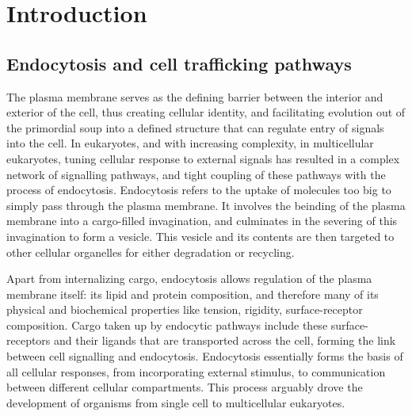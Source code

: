 \chapter{Introduction} %
\graphicspath{ {/Users/kaksonenlab/Desktop/figures/} }
\label{Ch:Intro} %

\section{Endocytosis and cell trafficking pathways}
The plasma membrane serves as the defining barrier between the interior and exterior of the cell, thus creating cellular identity, and facilitating evolution out of the primordial soup into a defined structure that can regulate entry of signals into the cell. In eukaryotes, and with increasing complexity, in multicellular eukaryotes, tuning cellular response to external signals has resulted in a complex network of signalling pathways, and tight coupling of these pathways with the process of endocytosis. Endocytosis refers to the uptake of molecules too big to simply pass through the plasma membrane. It involves the beinding of the plasma membrane into a cargo-filled invagination, and culminates in the severing of this invagination to form a vesicle. This vesicle and its contents are then targeted to other cellular organelles for either degradation or recycling. 


\vspace{5mm}

Apart from internalizing cargo, endocytosis allows regulation of the plasma membrane itself: its lipid and protein composition, and therefore many of its physical and biochemical properties like tension, rigidity, surface-receptor composition. Cargo taken up by endocytic pathways include these surface-receptors and their ligands that are transported across the cell, forming the link between cell signalling and endocytosis.
Endocytosis essentially forms the basis of all cellular responses, from incorporating external stimulus, to communication between different cellular compartments. This process arguably drove the development of organisms from single cell to multicellular eukaryotes.  



